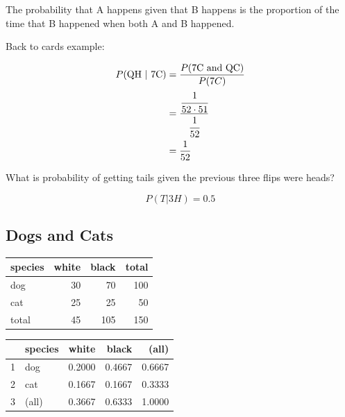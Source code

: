 \documentclass[landscape]{exam}
\begin{document}
  The probability that A happens given that B happens is the proportion of the
  time that B happened when both A and B happened.

  Back to cards example:
  \begin{solution}
    \begin{align*}
    P(\text{QH } | \text{ 7C})  & = \frac{P(\text{7C and QC})}{P(7C)} \\
                                & = \frac{\cfrac{1}{52 \cdot 51}}{\cfrac{1}{52}} \\
                                & = \frac{1}{52} \\
    \end{align*}
  \end{solution}

  What is probability of getting tails given the previous three flips were heads?
  \begin{solution}
    \[
      P(T | 3H) = 0.5
    \]
  \end{solution}

  \subsection{Dogs and Cats}
  \begin{table}[H]
    \begin{tabular}[H]{lrrr}
      \toprule
      species & white & black & total\\
      \midrule
      dog     & 30    & 70    & 100\\
      cat     & 25    & 25    & 50\\
      \midrule
      total   & 45    & 105   & 150\\
      \bottomrule
    \end{tabular}
  \end{table}

  \begin{table}[H]
    \begin{tabular}{rlrrr}
      \toprule
        & species & white  & black  & (all) \\
      \midrule
      1 & dog     & 0.2000 & 0.4667 & 0.6667 \\
      2 & cat     & 0.1667 & 0.1667 & 0.3333 \\
      \midrule
      3 & (all)   & 0.3667 & 0.6333 & 1.0000 \\
      \bottomrule
    \end{tabular}
  \end{table}
\end{document}
